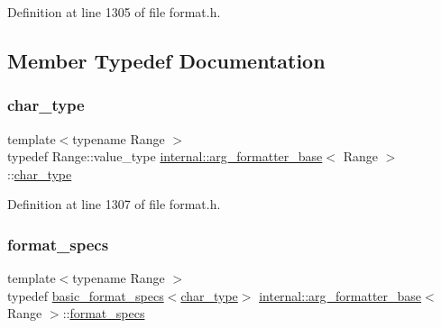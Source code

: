 Definition at line 1305 of file format.\+h.



\subsection{Member Typedef Documentation}
\mbox{\label{classinternal_1_1arg__formatter__base_a407930bf282880d2ca45dfa8f5d2034b}} 
\subsubsection{\texorpdfstring{char\+\_\+type}{char\_type}}
{\footnotesize\ttfamily template$<$typename Range $>$ \\
typedef Range\+::value\+\_\+type \hyperlink{classinternal_1_1arg__formatter__base}{internal\+::arg\+\_\+formatter\+\_\+base}$<$ Range $>$\+::\hyperlink{classinternal_1_1arg__formatter__base_a407930bf282880d2ca45dfa8f5d2034b}{char\+\_\+type}}



Definition at line 1307 of file format.\+h.

\mbox{\label{classinternal_1_1arg__formatter__base_acff46f7da1afa536210eb77a2ea0d775}} 
\subsubsection{\texorpdfstring{format\+\_\+specs}{format\_specs}}
{\footnotesize\ttfamily template$<$typename Range $>$ \\
typedef \hyperlink{structbasic__format__specs}{basic\+\_\+format\+\_\+specs}$<$\hyperlink{classinternal_1_1arg__formatter__base_a407930bf282880d2ca45dfa8f5d2034b}{char\+\_\+type}$>$ \hyperlink{classinternal_1_1arg__formatter__base}{internal\+::arg\+\_\+formatter\+\_\+base}$<$ Range $>$\+::\hyperlink{classinternal_1_1arg__formatter__base_acff46f7da1afa536210eb77a2ea0d775}{format\+\_\+specs}}



